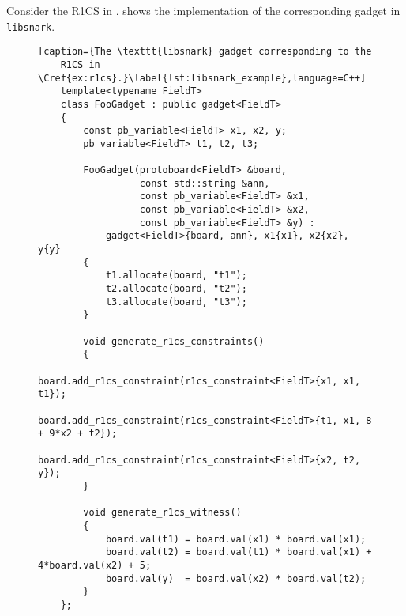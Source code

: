 \begin{example}
  Consider the R1CS in .
   shows the implementation of the corresponding gadget in 
  \texttt{libsnark}.
\end{example}

\begin{figure}
  \centering
  \begin{lstlisting}[caption={The \texttt{libsnark} gadget corresponding to the 
    R1CS in \Cref{ex:r1cs}.}\label{lst:libsnark_example},language=C++]
    template<typename FieldT>
    class FooGadget : public gadget<FieldT>
    {
        const pb_variable<FieldT> x1, x2, y;
        pb_variable<FieldT> t1, t2, t3;

        FooGadget(protoboard<FieldT> &board, 
                  const std::string &ann,
                  const pb_variable<FieldT> &x1, 
                  const pb_variable<FieldT> &x2, 
                  const pb_variable<FieldT> &y) : 
            gadget<FieldT>{board, ann}, x1{x1}, x2{x2}, y{y}
        {
            t1.allocate(board, "t1");
            t2.allocate(board, "t2");
            t3.allocate(board, "t3");
        }

        void generate_r1cs_constraints()
        {
            board.add_r1cs_constraint(r1cs_constraint<FieldT>{x1, x1, t1});
            board.add_r1cs_constraint(r1cs_constraint<FieldT>{t1, x1, 8 + 9*x2 + t2});
            board.add_r1cs_constraint(r1cs_constraint<FieldT>{x2, t2, y});
        }

        void generate_r1cs_witness()
        {
            board.val(t1) = board.val(x1) * board.val(x1);
            board.val(t2) = board.val(t1) * board.val(x1) + 4*board.val(x2) + 5;
            board.val(y)  = board.val(x2) * board.val(t2);
        }
    };
  \end{lstlisting}
\end{figure}

